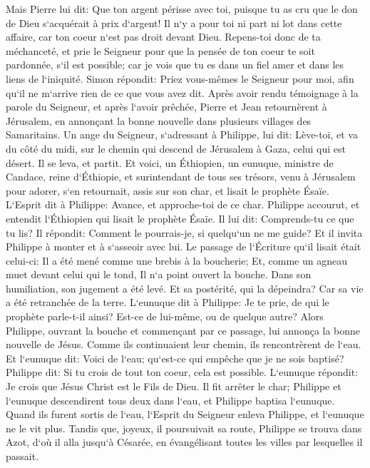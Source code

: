 \verse Mais Pierre lui dit: Que ton argent périsse avec toi, puisque tu as cru que le don de Dieu s`acquérait à prix d`argent! 
\verse Il n`y a pour toi ni part ni lot dans cette affaire, car ton coeur n`est pas droit devant Dieu. 
\verse Repens-toi donc de ta méchanceté, et prie le Seigneur pour que la pensée de ton coeur te soit pardonnée, s`il est possible; 
\verse car je vois que tu es dans un fiel amer et dans les liens de l`iniquité. 
\verse Simon répondit: Priez vous-mêmes le Seigneur pour moi, afin qu`il ne m`arrive rien de ce que vous avez dit. 
\verse Après avoir rendu témoignage à la parole du Seigneur, et après l`avoir prêchée, Pierre et Jean retournèrent à Jérusalem, en annonçant la bonne nouvelle dans plusieurs villages des Samaritains. 
\verse Un ange du Seigneur, s`adressant à Philippe, lui dit: Lève-toi, et va du côté du midi, sur le chemin qui descend de Jérusalem à Gaza, celui qui est désert. 
\verse Il se leva, et partit. Et voici, un Éthiopien, un eunuque, ministre de Candace, reine d`Éthiopie, et surintendant de tous ses trésors, venu à Jérusalem pour adorer, 
\verse s`en retournait, assis sur son char, et lisait le prophète Ésaïe. 
\verse L`Esprit dit à Philippe: Avance, et approche-toi de ce char. 
\verse Philippe accourut, et entendit l`Éthiopien qui lisait le prophète Ésaïe. Il lui dit: Comprends-tu ce que tu lis? 
\verse Il répondit: Comment le pourrais-je, si quelqu`un ne me guide? Et il invita Philippe à monter et à s`asseoir avec lui. 
\verse Le passage de l`Écriture qu`il lisait était celui-ci: Il a été mené comme une brebis à la boucherie; Et, comme un agneau muet devant celui qui le tond, Il n`a point ouvert la bouche. 
\verse Dans son humiliation, son jugement a été levé. Et sa postérité, qui la dépeindra? Car sa vie a été retranchée de la terre. 
\verse L`eunuque dit à Philippe: Je te prie, de qui le prophète parle-t-il ainsi? Est-ce de lui-même, ou de quelque autre? 
\verse Alors Philippe, ouvrant la bouche et commençant par ce passage, lui annonça la bonne nouvelle de Jésus. 
\verse Comme ils continuaient leur chemin, ils rencontrèrent de l`eau. Et l`eunuque dit: Voici de l`eau; qu`est-ce qui empêche que je ne sois baptisé? 
\verse Philippe dit: Si tu crois de tout ton coeur, cela est possible. L`eunuque répondit: Je crois que Jésus Christ est le Fils de Dieu. 
\verse Il fit arrêter le char; Philippe et l`eunuque descendirent tous deux dans l`eau, et Philippe baptisa l`eunuque. 
\verse Quand ils furent sortis de l`eau, l`Esprit du Seigneur enleva Philippe, et l`eunuque ne le vit plus. Tandis que, joyeux, il poursuivait sa route, 
\verse Philippe se trouva dans Azot, d`où il alla jusqu`à Césarée, en évangélisant toutes les villes par lesquelles il passait. 

